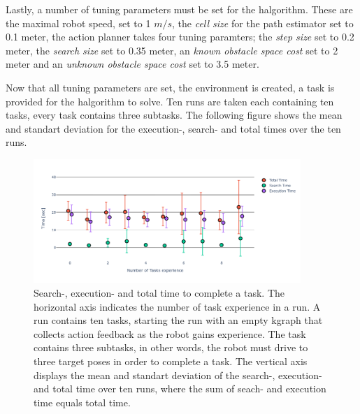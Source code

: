 Lastly, a number of tuning parameters must be set for the \ac{halgorithm}. These are the maximal robot speed, set to 1 $m/s$, the \textit{cell size} for the path estimator set to 0.1 meter, the action planner takes four tuning paramters; the \textit{step size} set to 0.2 meter, the \textit{search size} set to 0.35 meter, an \textit{known obstacle space cost} set to 2 meter and an \textit{unknown obstacle space cost} set to 3.5 meter.\bs

Now that all tuning parameters are set, the environment is created, a task is provided for the \ac{halgorithm} to solve. Ten runs are taken each containing ten tasks, every task contains three subtasks. The following figure shows the mean and standart deviation for the execution-, search- and total times over the ten runs. 



\begin{figure}[H]
    \centering
    \includegraphics[width=0.9\textwidth]{figures/results/random_drive_kgraph}
    \caption{Search-, execution- and total time to complete a task. The horizontal axis indicates the number of task experience in a run. A run contains ten tasks, starting the run with an empty \ac{kgraph} that collects action feedback as the robot gains experience. The task contains three subtasks, in other words, the robot must drive to three target poses in order to complete a task. The vertical axis displays the mean and standart deviation of the search-, execution- and total time over ten runs, where the sum of seach- and execution time equals total time.}%
   \label{fig:rand_drive_times}
\end{figure}




